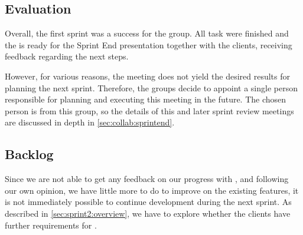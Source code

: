 
\subsection{Evaluation}

Overall, the first sprint was a success for the group.
All task were finished and the \launcher is ready for the Sprint End presentation together with the clients, receiving feedback regarding the next steps.

However, for various reasons, the meeting does not yield the desired results for planning the next sprint.
Therefore, the groups decide to appoint a single person responsible for planning and executing this meeting in the future.
The chosen person is from this group, so the details of this and later sprint review meetings are discussed in depth in \cref{sec:collab:sprintend}.

\subsection{Backlog}
Since we are not able to get any feedback on our progress with \launcher, and following our own opinion, we have little more to do to improve on the existing features, it is not immediately possible to continue development during the next sprint. 
As described in \cref{sec:sprint2:overview}, we have to explore whether the clients have further requirements for \launcher. 